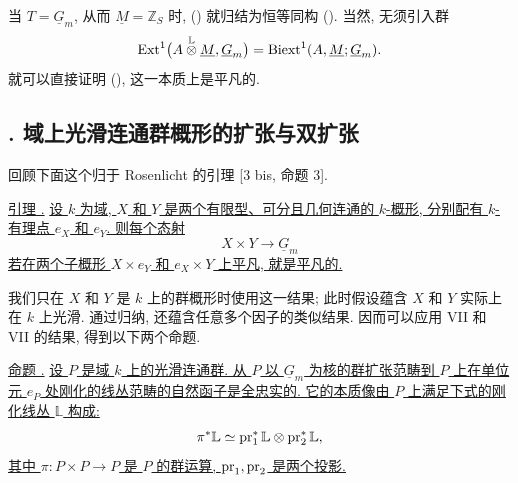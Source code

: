 当 $T=\underline G_m$, 从而 $\underline M=\mathbb Z_S$ 时, () 就归结为恒等同构 (). 当然, 无须引入群
\[
 \Ext^1\bigl(A\mathbin{\mathop{\otimes}^{\mathbb L}}\underline M,
              \underline G_m\bigr)
 =\Biext^1(A,\underline M;\underline G_m).
\]
就可以直接证明 (), 这一本质上是平凡的.




\subsection*{. 域上光滑连通群概形的扩张与双扩张}

回顾下面这个归于 Rosenlicht 的引理 [3 bis, 命题 3].

\medskip
\noindent\underline{引理 .} \underline{设 $k$ 为域, $X$ 和 $Y$ 是两个有限型、可分且几何连通的 $k$-概形, 分别配有 $k$-有理点 $e_X$ 和 $e_Y$. 则每个态射}
\[
 X\times Y\longrightarrow\underline G_m
\]
\underline{若在两个子概形 $X\times e_Y$ 和 $e_X\times Y$ 上平凡, 就是平凡的.}

我们只在 $X$ 和 $Y$ 是 $k$ 上的群概形时使用这一结果; 此时假设蕴含 $X$ 和 $Y$ 实际上在 $k$ 上光滑. 通过归纳,  还蕴含任意多个因子的类似结果. 因而可以应用 VII  和 VII  的结果, 得到以下两个命题.

\medskip
\noindent\underline{命题 .} \underline{设 $P$ 是域 $k$ 上的光滑连通群. 从 $P$ 以 $\underline G_m$ 为核的群扩张范畴到 $P$ 上在单位元 $e_P$ 处刚化的线丛范畴的自然函子是全忠实的. 它的本质像由 $P$ 上满足下式的刚化线丛 $\mathbb L$ 构成:}
\[
 \pi^*\mathbb L\simeq
 \operatorname{pr}_1^*\mathbb L\otimes\operatorname{pr}_2^*\mathbb L,
\]
\underline{其中 $\pi:P\times P\longrightarrow P$ 是 $P$ 的群运算, $\operatorname{pr}_1,\operatorname{pr}_2$ 是两个投影.}

